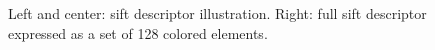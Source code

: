 \begin{frame}
\begin{columns}
\begin{column}{.7\textwidth}
\begin{figure}[htbp]
\caption{{\tiny Left and center: \acf{sift} descriptor illustration\footnotemark[1]. Right: full \ac{sift} descriptor expressed as a set of 128 colored elements.}}
\end{figure}
\end{column}
\end{columns}
\end{frame}

